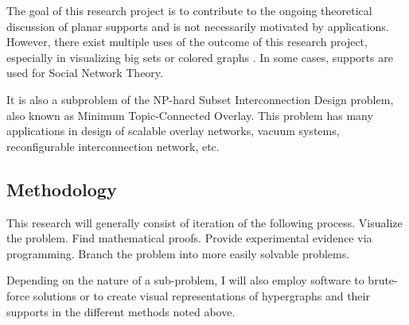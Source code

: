 \documentclass{NSF}
\begin{document}
The goal of this research project is to contribute to the ongoing theoretical discussion of planar supports and is not necessarily motivated by applications. However, there exist multiple uses of the outcome of this research project, especially in visualizing big sets \cite{meulemans2013} or colored graphs \cite{hurtado2017}. In some cases, supports are used for Social Network Theory.

It is also a subproblem of the NP-hard Subset Interconnection Design problem, also known as Minimum Topic-Connected Overlay. This problem has many applications in design of scalable overlay networks, vacuum systems, reconfigurable interconnection network, etc. \cite{Chen2015}



\subsection{Methodology}

This research will generally consist of iteration of the following process. Visualize the problem. Find mathematical proofs. Provide experimental evidence via programming. Branch the problem into more easily solvable problems. 

Depending on the nature of a sub-problem, I will also employ software to brute-force solutions or to create visual representations of hypergraphs and their supports in the different methods noted above.



\renewcommand\refname{References}


\end{document}
